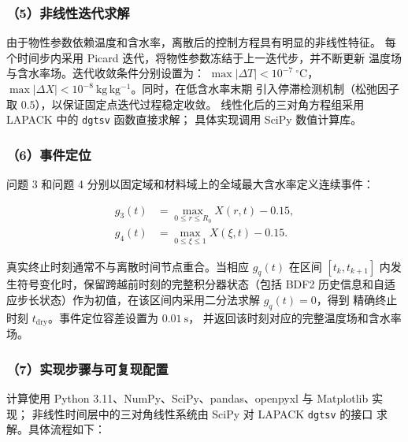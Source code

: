 \documentclass[withoutpreface,bwprint]{cumcmthesis}
\begin{document}
\subsubsection*{（5）非线性迭代求解}

由于物性参数依赖温度和含水率，离散后的控制方程具有明显的非线性特征。
每个时间步内采用 Picard 迭代，将物性参数冻结于上一迭代步，并不断更新
温度场与含水率场。迭代收敛条件分别设置为：
$\max|\Delta T|<10^{-7}\ ^\circ\mathrm{C}$，
$\max|\Delta X|<10^{-8}\ \mathrm{kg\,kg^{-1}}$。同时，在低含水率末期
引入停滞检测机制（松弛因子取 $0.5$），以保证固定点迭代过程稳定收敛。
线性化后的三对角方程组采用 LAPACK 中的 \texttt{dgtsv} 函数直接求解；
具体实现调用 SciPy 数值计算库\cite{virtanen2020}。

\subsubsection*{（6）事件定位}

问题 3 和问题 4 分别以固定域和材料域上的全域最大含水率定义连续事件：

\begin{equation}
  \begin{aligned}
    g_3(t)&=\max_{0\le r\le R_0}X(r,t)-0.15,\\
    g_4(t)&=\max_{0\le \xi\le1}X(\xi,t)-0.15.
  \end{aligned}
  \label{eq:event}
\end{equation}

真实终止时刻通常不与离散时间节点重合。当相应 $g_q(t)$ 在区间
$[t_k,t_{k+1}]$ 内发生符号变化时，保留跨越前时刻的完整积分器状态（包括
BDF2 历史信息和自适应步长状态）作为初值，在该区间内采用二分法求解
$g_q(t)=0$，得到
精确终止时刻 $t_{\mathrm{dry}}$。事件定位容差设置为 $0.01\ \mathrm{s}$，
并返回该时刻对应的完整温度场和含水率场。

\subsubsection*{（7）实现步骤与可复现配置}

计算使用 Python 3.11、NumPy、SciPy、pandas、openpyxl 与 Matplotlib 实现；
非线性时间层中的三对角线性系统由 SciPy 对 LAPACK \texttt{dgtsv} 的接口
求解。具体流程如下：
\end{document}
